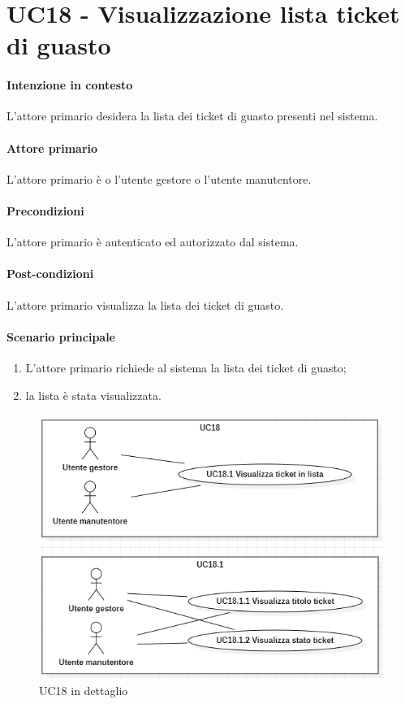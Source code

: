 \section{UC18 - Visualizzazione lista ticket di guasto}\label{uc:18}
\paragraph{Intenzione in contesto} L'attore primario desidera la lista dei ticket di guasto presenti nel sistema.

\paragraph{Attore primario} L'attore primario è o l'utente gestore o l'utente manutentore.
\paragraph{Precondizioni} L'attore primario è autenticato ed autorizzato dal sistema.
\paragraph{Post-condizioni} L'attore primario visualizza la lista dei ticket di guasto.
\paragraph{Scenario principale}
\begin{enumerate}
    \item L'attore primario richiede al sistema la lista dei ticket di guasto;
    \item la lista è stata visualizzata.
\end{enumerate}

\begin{figure}[h]
    \includegraphics[width=\textwidth]{contenuti/img/casi_uso_grafici-uc18.png}
    \caption{UC18 in dettaglio}
    \label{fig:uc18}
\end{figure}

